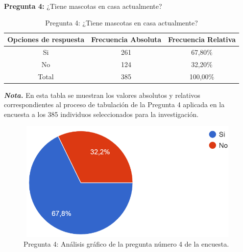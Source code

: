 \documentclass[12pt, a4paper, nofontenc, numbers=endperiod]{apa7}
\begin{document}
{\newpage

\setlength{\parindent}{0cm}\textbf{Pregunta 4:} ¿Tiene mascotas en casa actualmente?\\[-0.9cm]

\begin{table}[h]
	{\renewcommand{\arraystretch}{1.2} 		
		\caption{Pregunta 4: ¿Tiene mascotas en casa actualmente?}
		\label{Tabla4} %
		
		\begin{tabular}{ccc}
			\toprule
			\multicolumn{1}{p{5cm}}{\hspace*{0.5cm}Opciones de respuesta} &\multicolumn{1}{p{4.75cm}}{\hspace*{0.5cm}Frecuencia Absoluta} & \multicolumn{1}{p{4.90cm}}{\hspace*{0.5cm}Frecuencia Relativa}
			\\
			\midrule
			\multicolumn{1}{c}{Si} & \multicolumn{1}{c}{261}&  \multicolumn{1}{c}{67,80\%}
			\\
			
			\multicolumn{1}{c}{No} &  \multicolumn{1}{c}{124} & \multicolumn{1}{c}{32,20\%}
			
			\\ 
			\midrule
			\multicolumn{1}{c}{Total} & \multicolumn{1}{c}{385} &\multicolumn{1}{c}{100,00\%}
			\\ 
			\midrule
		\end{tabular}
		\begin{tablenotes}[para,flushleft]
			{\small
				\textit{\textbf{Nota.}} En esta tabla se muestran los valores absolutos y relativos correspondientes al proceso de tabulación de la Pregunta 4 aplicada en la encuesta a los 385 individuos seleccionados para la investigación.
			}
		\end{tablenotes}
	}
\end{table}	

\vspace*{-0.1cm}
\begin{figure}[h]
	\caption{Pregunta 4: Análisis gráfico de la pregunta número 4 de la encuesta.}
	\label{Figura5} %
	\vspace*{0.1cm}
	\begin{center}
		\includegraphics[width=13cm,height=6cm]{Imagenes/Figura31}
	\end{center}
	

\end{figure}}
\end{document}
